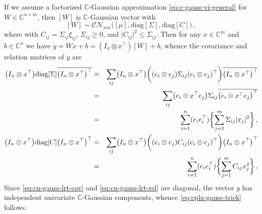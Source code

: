 \documentclass[a4paper,10pt,twocolumn]{article}
\newcommand{\cplx}{\mathbb{C}}
\newcommand{\conj}[1]{\overline{#1}}
\newcommand{\diag}[1]{\mathrm{diag}{#1}}
\begin{document}
If we assume a factorized $\cplx$-Gaussian approximation \eqref{eq:c-gauss-vi-general}
for $
  W \in \cplx^{n\times m}
$, then $[W]$ is $\cplx$-Gaussian vector with
\begin{equation}  \label{eq:c-gauss-vi-general-vec}
  [W]
    \sim \mathcal{C}\mathcal{N}_{nm} \bigl(
      [\mu], \diag{[\Sigma]}, \diag{[C]}
    \bigr)
  \,,
\end{equation}
where with $C_{ij} = \Sigma_{ij} \xi_{ij}$, $\Sigma_{ij} \geq 0$, and $
  \lvert C_{ij} \rvert^2 \leq \Sigma_{ij}
$. Then for any $x \in \cplx^m$ and $b\in \cplx^n$ we have $
  y = W x + b
    = (I_n \otimes x^\top) [W] + b
$, whence the covariance and relation matrices of $y$ are
\begin{eqnarray}
  \bigl(I_n \otimes x^\top\bigr)
    \diag{[\Sigma]}
  \conj{\bigl(I_n \otimes x^\top\bigr)^\top}
    &=& \sum_{ij}
      \bigl(I_n \otimes x^\top\bigr)
      \biggl(
        (e_i \otimes e_j)
          \Sigma_{ij}
        (e_i \otimes e_j)^\top
      \biggr)
      \conj{\bigl(I_n \otimes x^\top\bigr)^\top}
    \notag \\
    &=& \sum_{ij}
      \bigl(e_i \otimes x^\top e_j \bigr)
        \Sigma_{ij}
      \conj{\bigl(e_i \otimes x^\top e_j \bigr)^\top}
    \notag \\
    &=&
      \sum_{i=1}^n (e_i e_i^\top)
        \biggl\{
          \sum_{j=1}^m \Sigma_{ij} \lvert x_j \rvert^2
        \biggr\}
    \,,  \label{eq:cn-gauss-lrt-cov} \\
  \bigl(I_n \otimes x^\top\bigr)
    \diag{[C]}
  \bigl(I_n \otimes x^\top\bigr)^\top
    &=& \sum_{ij}
      \bigl(I_n \otimes x^\top\bigr)
      \biggl(
        (e_i \otimes e_j)
          C_{ij}
        (e_i \otimes e_j)^\top
      \biggr)
      \bigl(I_n \otimes x^\top\bigr)^\top
    \notag \\
    &=&
      \sum_{i=1}^n (e_i e_i^\top)
        \biggl\{
          \sum_{j=1}^m C_{ij} x_j^2
        \biggr\}
    \,.  \label{eq:cn-gauss-lrt-rel}
\end{eqnarray}
Since \eqref{eq:cn-gauss-lrt-cov} and \eqref{eq:cn-gauss-lrt-rel} are diagonal, the
vector $y$ has independent univariate $\cplx$-Gaussian components, whence
\eqref{eq:cplx-gauss-trick} follows.
\end{document}
